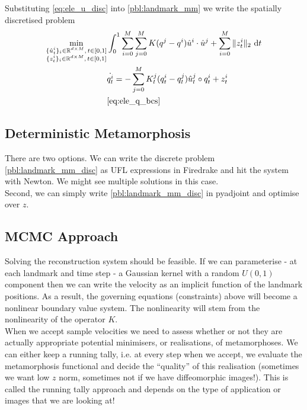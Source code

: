 \documentclass{article}
\newcommand{\norm}[2]{\| #1 \|_{ #2 }}
\newcommand{\ltwonorm}[1]{\norm{ #1 }{2}}
\newcommand{\diff}[1]{\text{d} #1}
\begin{document}
Substituting \eqref{eq:ele_u_disc} into
\eqref{pbl:landmark_mm} we write the spatially discretised problem
\begin{subequations}\label{pbl:landmark_mm_disc}
\begin{align}
\min_{\substack{\{\hat u^i_t\}_i \in \mathbb{R}^{d\times M},\, t\in[0,1]\\
\{z^i_t\}_i \in \mathbb{R}^{d\times M},\, t\in[0,1]}} & \int_0^1 \sum_{i=0}^M
\sum_{j=0}^M K(q^j-q^i)\hat u^i \cdot\hat u^j+ \sum_{i=0}^M
\ltwonorm{z^i_t} \diff{t}\\
            & \dot{q^i_t} = - \sum_{j=0}^M K^j_t(q^i_t-q^j_t)\hat u^j_t \circ
            q^i_t + z^i_t \label{eq:ele_q_disc} \\
            & \eqref{eq:ele_q_bcs}\nonumber
\end{align}
\end{subequations}

\subsection{Deterministic Metamorphosis}

There are two options. We can write the discrete problem
\eqref{pbl:landmark_mm_disc} as UFL expressions in Firedrake and hit the system
with Newton. We might see multiple solutions in this case.\\

Second, we can simply write \eqref{pbl:landmark_mm_disc} in pyadjoint and optimise
over $z$.

\subsection{MCMC Approach}

Solving the reconstruction system should be feasible.  If we can parameterise -
at each landmark and time step - a Gaussian kernel with a random $U(0,1)$
component then we can write the velocity as an implicit function of the landmark
positions. As a result, the governing equations (constraints) above will become
a nonlinear boundary value system. The nonlinearity will stem from the
nonlinearity of the operator $K$.\\

When we accept sample velocities we need to
assess whether or not they are actually appropriate potential minimisers, or
realisations, of metamorphoses. We can either keep a running tally, i.e. at
every step when we accept, we evaluate the metamorphosis functional and decide
the ``quality'' of this realisation (sometimes we want low $z$ norm, sometimes
not if we have diffeomorphic images!). This is called the running tally
approach and depends on the type of application or images that we are looking
at!




\end{document}
